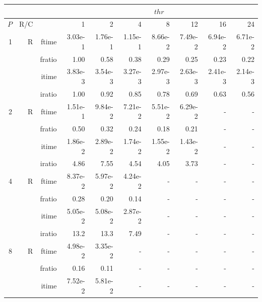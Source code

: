\documentclass[a4paper]{article}
\begin{document}
\begin{table}[htbp]
\begin{center}
\begin{small}
\begin{tabular}{|r|r|r|r|r|r|r|r|r|r|}
\hline 
     & & & \multicolumn{7}{c|}{$thr$} \\ \hline
    $P$ & R/C &  & 1           & 2    & 4    & 8    & 12   & 16    & 24  \\ \hline\hline
   1 &  R &   ftime &    3.03e-1 &    1.76e-1 &    1.15e-1 &    8.66e-2 &    7.49e-2 &    6.94e-2 &    6.71e-2 \\
             &             &  fratio &    1.00 &    0.58 &    0.38 &   0.29 &    0.25 &    0.23 &    0.22 \\
             &             &  itime &    3.83e-3 &    3.54e-3 &    3.27e-3 &    2.97e-3 &    2.63e-3 &    2.41e-3 &    2.14e-3 \\
             &             &  iratio &    1.00 &    0.92 &    0.85 &    0.78 &   0.69 &    0.63 &    0.56 \\\hline
   2 &  R &   ftime &    1.51e-1 &    9.84e-2 &    7.21e-2 &    5.51e-2 &    6.29e-2 &      - &      - \\
             &             &  fratio &    0.50 &    0.32 &    0.24 &    0.18 &   0.21 &      - &      - \\
             &             &  itime &    1.86e-2 &    2.89e-2 &    1.74e-2 &    1.55e-2 &    1.43e-2 &      - &      - \\
             &             &  iratio &    4.86  &   7.55  &    4.54  &   4.05  &    3.73  &      - &      - \\\hline
   4 &  R &   ftime &    8.37e-2 &    5.97e-2 &    4.24e-2 &      - &      - &      - &      - \\
             &             &  fratio &    0.28 &    0.20 &    0.14 &      - &      - &      - &      - \\
             &             &  itime &    5.05e-2 &    5.08e-2 &    2.87e-2 &      - &      - &      - &      - \\
             &             &  iratio &    13.2 &   13.3 &   7.49  &      - &      - &      - &      - \\\hline
   8 &   R &   ftime &    4.98e-2 &    3.35e-2 &      - &      - &      - &      - &      - \\
             &             &  fratio &    0.16 &    0.11 &      - &      - &      - &      - &      - \\
             &             &  itime &    7.52e-2 &    5.81e-2 &      - &      - &      - &      - &      - \\

\end{tabular}
\end{small}
\end{center}
\end{table}
\end{document}
